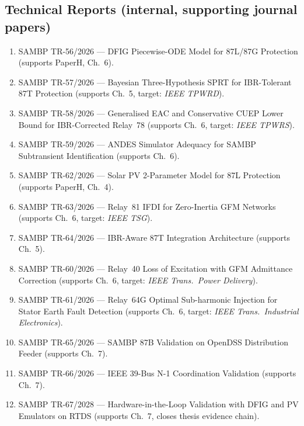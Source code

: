 \documentclass
    [phd,synopsis]
    {iitmdissertation}
\begin{document}
\subsection*{Technical Reports (internal, supporting journal papers)}

\begin{enumerate}

  \item SAMBP TR-56/2026 --- DFIG Piecewise-ODE Model for 87L/87G Protection
    (supports PaperH, Ch.~6).

  \item SAMBP TR-57/2026 --- Bayesian Three-Hypothesis SPRT for IBR-Tolerant
    87T Protection (supports Ch.~5, target: \textit{IEEE TPWRD}).

  \item SAMBP TR-58/2026 --- Generalised EAC and Conservative CUEP Lower Bound
    for IBR-Corrected Relay~78 (supports Ch.~6, target: \textit{IEEE TPWRS}).

  \item SAMBP TR-59/2026 --- ANDES Simulator Adequacy for SAMBP
    Subtransient Identification (supports Ch.~6).

  \item SAMBP TR-62/2026 --- Solar PV 2-Parameter Model for 87L Protection
    (supports PaperH, Ch.~4).

  \item SAMBP TR-63/2026 --- Relay~81 IFDI for Zero-Inertia GFM Networks
    (supports Ch.~6, target: \textit{IEEE TSG}).

  \item SAMBP TR-64/2026 --- IBR-Aware 87T Integration Architecture
    (supports Ch.~5).

  \item SAMBP TR-60/2026 --- Relay~40 Loss of Excitation with GFM
    Admittance Correction (supports Ch.~6, target:
    \textit{IEEE Trans.\ Power Delivery}).

  \item SAMBP TR-61/2026 --- Relay~64G Optimal Sub-harmonic Injection
    for Stator Earth Fault Detection (supports Ch.~6, target:
    \textit{IEEE Trans.\ Industrial Electronics}).

  \item SAMBP TR-65/2026 --- SAMBP 87B Validation on OpenDSS
    Distribution Feeder (supports Ch.~7).

  \item SAMBP TR-66/2026 --- IEEE 39-Bus N-1 Coordination Validation
    (supports Ch.~7).

  \item SAMBP TR-67/2028 --- Hardware-in-the-Loop Validation with DFIG
    and PV Emulators on RTDS (supports Ch.~7, closes thesis evidence chain).

\end{enumerate}
\end{document}
